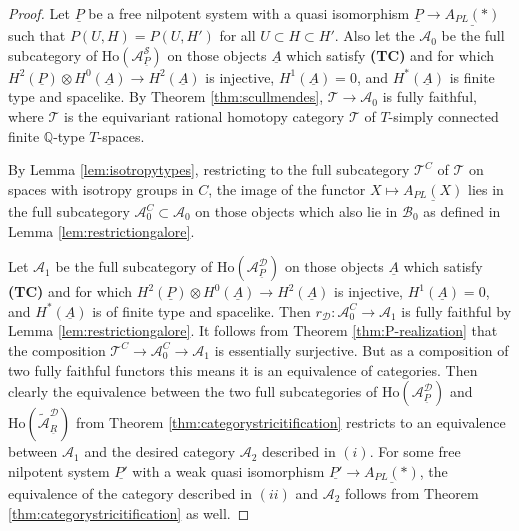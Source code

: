 \documentclass[12pt,a4paper]{article}
\theoremstyle{definition}
\begin{document}
\begin{proof}
Let $\underline{P}$ be a free nilpotent system with a quasi isomorphism $\underline{P}\rightarrow \underline{A_{PL}(*)}$ such that $P(U,H)=P(U,H')$ for all $U\subset H\subset H'$. Also let the $\mathcal{A}_0$ be the full subcategory of $\mathrm{Ho}(\mathcal{A}^{\mathcal{S}}_{\underline{P}})$ on those objects $\underline{A}$ which satisfy \textbf{(TC)} and for which $H^2(\underline{P})\otimes H^0(\underline{A})\rightarrow H^2(\underline{A})$ is injective, $H^1(\underline{A})=0$, and $H^*(\underline{A})$ is finite type and spacelike.
By Theorem \ref{thm:scullmendes}, $\mathcal{T}\rightarrow \mathcal{A}_0$ is fully faithful, where $\mathcal{T}$ is the equivariant rational homotopy category $\mathcal{T}$ of $T$-simply connected finite $\mathbb{Q}$-type $T$-spaces.

By Lemma \ref{lem:isotropytypes}, restricting to the full subcategory $\mathcal{T}^C$ of $\mathcal{T}$ on spaces with isotropy groups in $C$, the image of the functor $X\mapsto \underline{A_{PL}(X)}$ lies in the full subcategory $\mathcal{A}_0^C\subset \mathcal{A}_0$ on those objects which also lie in $\mathcal{B}_0$ as defined in Lemma \ref{lem:restrictiongalore}.

Let $\mathcal{A}_1$ be the full subcategory of $\mathrm{Ho}(\mathcal{A}^\mathcal{D}_{\underline{P}})$ on those objects $\underline{A}$ which satisfy \textbf{(TC)} and for which $H^2(\underline{P})\otimes H^0(\underline{A})\rightarrow H^2(\underline{A})$ is injective, $H^1(\underline{A})=0$, and $H^*(\underline{A})$ is of finite type and spacelike. Then $r_\mathcal{D}\colon \mathcal{A}_0^C\rightarrow \mathcal{A}_1$ is fully faithful by Lemma \ref{lem:restrictiongalore}. It follows from Theorem \ref{thm:P-realization} that the composition $\mathcal{T}^C\rightarrow \mathcal{A}_0^C\rightarrow\mathcal{A}_1$ is essentially surjective.
But as a composition of two fully faithful functors this means it is an equivalence of categories. Then clearly the equivalence between the two full subcategories of $\mathrm{Ho}(\mathcal{A}^\mathcal{D}_{\underline{P}})$ and $\mathrm{Ho}(\widetilde{\mathcal{A}}^\mathcal{D}_{\underline{R}})$ from Theorem \ref{thm:categorystricitification} restricts to an equivalence between $\mathcal{A}_1$ and the desired category $\mathcal{A}_2$ described in $(i)$. For some free nilpotent system $\underline{P'}$ with a weak quasi isomorphism $\underline{P'}\rightarrow \underline{A_{PL}(*)}$, the equivalence of the category described in $(ii)$ and $\mathcal{A}_2$ follows from Theorem \ref{thm:categorystricitification} as well.
\end{proof}






\end{document}
